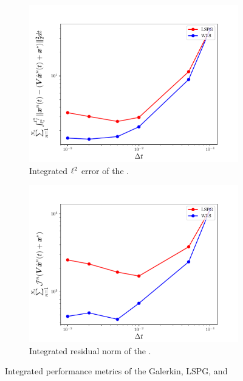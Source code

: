\begin{figure}
\begin{center}
\begin{subfigure}[t]{0.45\textwidth}
\includegraphics[width=1.\linewidth]{figs/sod/error_vs_window_dtvar.pdf}
\caption{Integrated $\ell^2$ error of the \methodAcronymROM.}
\label{fig:sod_error_methods_a}
\end{subfigure}
\begin{subfigure}[t]{0.45\textwidth}
\includegraphics[width=1.\linewidth]{figs/sod/objective_vs_window_dtvar.pdf}
\caption{Integrated residual norm of the \methodAcronymROM.} 
\label{fig:sod_error_methods_b}
\end{subfigure}
\caption{Integrated performance metrics of the Galerkin, LSPG, and \methodAcronymROMs} 
\label{fig:time_step_study}
\end{center}
\end{figure}


